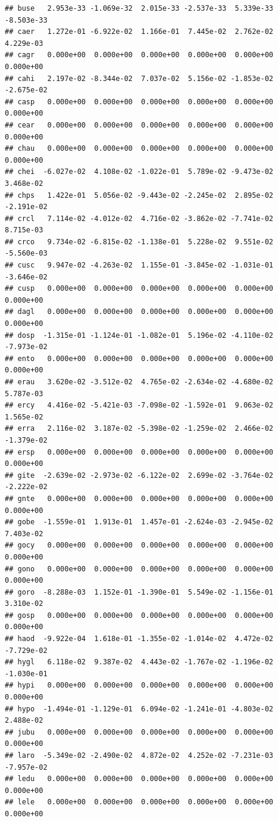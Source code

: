 \documentclass[
]{article}
\begin{document}
\begin{verbatim}
## buse   2.953e-33 -1.069e-32  2.015e-33 -2.537e-33  5.339e-33 -8.503e-33
## caer   1.272e-01 -6.922e-02  1.166e-01  7.445e-02  2.762e-02  4.229e-03
## cagr   0.000e+00  0.000e+00  0.000e+00  0.000e+00  0.000e+00  0.000e+00
## cahi   2.197e-02 -8.344e-02  7.037e-02  5.156e-02 -1.853e-02 -2.675e-02
## casp   0.000e+00  0.000e+00  0.000e+00  0.000e+00  0.000e+00  0.000e+00
## cear   0.000e+00  0.000e+00  0.000e+00  0.000e+00  0.000e+00  0.000e+00
## chau   0.000e+00  0.000e+00  0.000e+00  0.000e+00  0.000e+00  0.000e+00
## chei  -6.027e-02  4.108e-02 -1.022e-01  5.789e-02 -9.473e-02  3.468e-02
## chps   1.422e-01  5.056e-02 -9.443e-02 -2.245e-02  2.895e-02 -2.191e-02
## crcl   7.114e-02 -4.012e-02  4.716e-02 -3.862e-02 -7.741e-02  8.715e-03
## crco   9.734e-02 -6.815e-02 -1.138e-01  5.228e-02  9.551e-02 -5.560e-03
## cusc   9.947e-02 -4.263e-02  1.155e-01 -3.845e-02 -1.031e-01 -3.646e-02
## cusp   0.000e+00  0.000e+00  0.000e+00  0.000e+00  0.000e+00  0.000e+00
## dagl   0.000e+00  0.000e+00  0.000e+00  0.000e+00  0.000e+00  0.000e+00
## dosp  -1.315e-01 -1.124e-01 -1.082e-01  5.196e-02 -4.110e-02 -7.973e-02
## ento   0.000e+00  0.000e+00  0.000e+00  0.000e+00  0.000e+00  0.000e+00
## erau   3.620e-02 -3.512e-02  4.765e-02 -2.634e-02 -4.680e-02  5.787e-03
## ercy   4.416e-02 -5.421e-03 -7.098e-02 -1.592e-01  9.063e-02  1.565e-02
## erra   2.116e-02  3.187e-02 -5.398e-02 -1.259e-02  2.466e-02 -1.379e-02
## ersp   0.000e+00  0.000e+00  0.000e+00  0.000e+00  0.000e+00  0.000e+00
## gite  -2.639e-02 -2.973e-02 -6.122e-02  2.699e-02 -3.764e-02 -2.222e-02
## gnte   0.000e+00  0.000e+00  0.000e+00  0.000e+00  0.000e+00  0.000e+00
## gobe  -1.559e-01  1.913e-01  1.457e-01 -2.624e-03 -2.945e-02  7.403e-02
## gocy   0.000e+00  0.000e+00  0.000e+00  0.000e+00  0.000e+00  0.000e+00
## gono   0.000e+00  0.000e+00  0.000e+00  0.000e+00  0.000e+00  0.000e+00
## goro  -8.288e-03  1.152e-01 -1.390e-01  5.549e-02 -1.156e-01  3.310e-02
## gosp   0.000e+00  0.000e+00  0.000e+00  0.000e+00  0.000e+00  0.000e+00
## haod  -9.922e-04  1.618e-01 -1.355e-02 -1.014e-02  4.472e-02 -7.729e-02
## hygl   6.118e-02  9.387e-02  4.443e-02 -1.767e-02 -1.196e-02 -1.030e-01
## hypi   0.000e+00  0.000e+00  0.000e+00  0.000e+00  0.000e+00  0.000e+00
## hypo  -1.494e-01 -1.129e-01  6.094e-02 -1.241e-01 -4.803e-02  2.488e-02
## jubu   0.000e+00  0.000e+00  0.000e+00  0.000e+00  0.000e+00  0.000e+00
## laro  -5.349e-02 -2.490e-02  4.872e-02  4.252e-02 -7.231e-03 -7.957e-02
## ledu   0.000e+00  0.000e+00  0.000e+00  0.000e+00  0.000e+00  0.000e+00
## lele   0.000e+00  0.000e+00  0.000e+00  0.000e+00  0.000e+00  0.000e+00

\end{verbatim}
\end{document}

